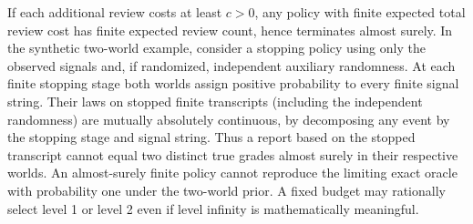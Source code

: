 \documentclass[11pt,letterpaper]{article}
\theoremstyle{definition}\newtheorem{definition}[theorem]{Definition}\newtheorem{example}[theorem]{Example}\newtheorem{conjecture}[theorem]{Conjecture}
\begin{document}
If each additional review costs at least $c>0$, any policy with finite expected total review cost has finite expected review count, hence terminates almost surely. In the synthetic two-world example, consider a stopping policy using only the observed signals and, if randomized, independent auxiliary randomness. At each finite stopping stage both worlds assign positive probability to every finite signal string. Their laws on stopped finite transcripts (including the independent randomness) are mutually absolutely continuous, by decomposing any event by the stopping stage and signal string. Thus a report based on the stopped transcript cannot equal two distinct true grades almost surely in their respective worlds. An almost-surely finite policy cannot reproduce the limiting exact oracle with probability one under the two-world prior. A fixed budget may rationally select level 1 or level 2 even if level infinity is mathematically meaningful.
\end{document}
